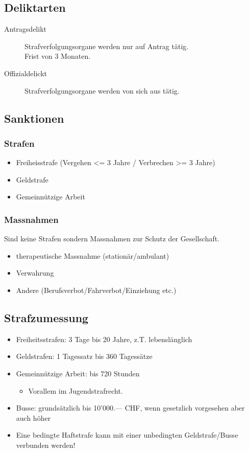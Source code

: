 \subsection{Deliktarten}
\begin{description}
	\item[Antragsdelikt] Strafverfolgungsorgane werden nur auf Antrag tätig.\\
	Frist von 3 Monaten.
	\item[Offizialdelickt] Strafverfolgungsorgane werden von sich aus tätig.
\end{description}

\subsection{Sanktionen}
\subsubsection{Strafen}

\begin{itemize}
	\tightlist
	\item Freiheisstrafe (Vergehen <= 3 Jahre / Verbrechen >= 3 Jahre)
	\item Geldstrafe
	\item Gemeinnützige Arbeit
\end{itemize}

\subsubsection{Massnahmen}

Sind keine Strafen sondern Massnahmen zur Schutz der Gesellschaft.

\begin{itemize}
	\item therapeutische Massnahme (stationär/ambulant)
	\item Verwahrung
	\item Andere (Berufsverbot/Fahrverbot/Einziehung etc.)
\end{itemize}


\subsection{Strafzumessung}
\begin{itemize}
	\tightlist
	\item Freiheitsstrafen: 3 Tage bis 20 Jahre, z.T. lebenslänglich
	\item Geldstrafen: 1 Tagessatz bis 360 Tagessätze
	\item Gemeinnützige Arbeit: bis 720 Stunden
	\begin{itemize}
		\tightlist
		\item Vorallem im Jugendstrafrecht.
	\end{itemize}
	\item Busse: grundsätzlich bis 10'000.--- CHF, wenn gesetzlich vorgesehen
	aber auch höher
	\item Eine bedingte Haftstrafe kann mit einer unbedingten Geldstrafe/Busse
	verbunden werden!
\end{itemize}

